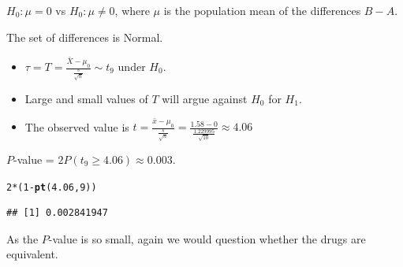 \documentclass[t,xcolor=pdftex,dvipsnames,table]{beamer}\usepackage[]{graphicx}\usepackage[]{color}
\makeatletter
\newcommand{\hlnum}[1]{\textcolor[rgb]{0.686,0.059,0.569}{#1}}%
\newcommand{\hlopt}[1]{\textcolor[rgb]{0,0,0}{#1}}%
\newcommand{\hlstd}[1]{\textcolor[rgb]{0.345,0.345,0.345}{#1}}%
\newcommand{\hlkwd}[1]{\textcolor[rgb]{0.737,0.353,0.396}{\textbf{#1}}}%
\newenvironment{kframe}{%
 \def\at@end@of@kframe{}%
 \ifinner\ifhmode%
  \def\at@end@of@kframe{\end{minipage}}%
  \begin{minipage}{\columnwidth}%
 \fi\fi%
 \def\FrameCommand##1{\hskip\@totalleftmargin \hskip-\fboxsep
 \colorbox{shadecolor}{##1}\hskip-\fboxsep
     \hskip-\linewidth \hskip-\@totalleftmargin \hskip\columnwidth}%
 \MakeFramed {\advance\hsize-\width
   \@totalleftmargin\z@ \linewidth\hsize
   \@setminipage}}%
 {\par\unskip\endMakeFramed%
 \at@end@of@kframe}
\newenvironment{knitrout}{}{} %
\makeatother
\begin{document}
\begin{frame}[fragile]{}

$H_{0}: \mu = 0$ vs $H_{0}: \mu \neq 0$, where $\mu$ is the population mean of the differences $B-A$.

\vspace{.5cm}
 The set of differences is Normal.

\vspace{.5cm}
\begin{itemize}
\item $\tau = T = \frac{\bar{X} - \mu_{0}}{\frac{s}{\sqrt{n}}}  \sim t_{9}$ under $H_{0}$. 
\item Large and small values of $T$ will argue against $H_{0}$ for $H_{1}$. 
\item The observed value is $t=  \frac{\bar{x} - \mu_{0}}{\frac{s}{\sqrt{n}}} = \frac{1.58 - 0}{\frac{1.229995}{\sqrt{10}}} \approx 4.06$
\end{itemize}

\vspace{.5cm}
 $P$-value = $2 P( t_{9} \geq 4.06) \approx  0.003$.

\begin{knitrout}
\color{fgcolor}\begin{kframe}
\begin{alltt}
\hlnum{2}\hlopt{*}\hlstd{(}\hlnum{1}\hlopt{-}\hlkwd{pt}\hlstd{(}\hlnum{4.06}\hlstd{,}\hlnum{9}\hlstd{))}
\end{alltt}
\begin{verbatim}
## [1] 0.002841947
\end{verbatim}
\end{kframe}
\end{knitrout}

\vspace{.5cm}
 As the $P$-value is so small, again we would question whether the drugs are equivalent.
\end{frame}  
\end{document}
